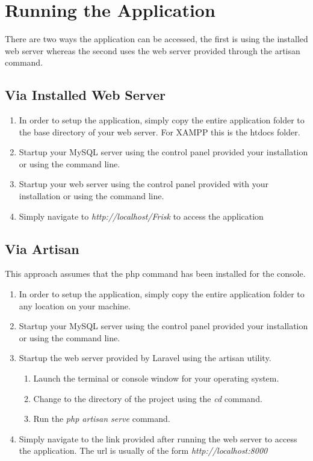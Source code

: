 \documentclass[12pt]{article}
\begin{document}
\section{Running the Application}
There are two ways the application can be accessed, the first is using the installed web server whereas the second uses the web server provided through the artisan command.

\subsection{Via Installed Web Server}
\begin{enumerate}
	\item In order to setup the application, simply copy the entire application folder to the base directory of your web server. For XAMPP this is the htdocs folder.
	\item Startup your MySQL server using the control panel provided your installation or using the command line.
	\item Startup your web server using the control panel provided with your installation or using the command line.
	\item Simply navigate to \emph{http://localhost/Frisk} to access the application
\end{enumerate}

\subsection{Via Artisan}
This approach assumes that the php command has been installed for the console.
\begin{enumerate}
	\item In order to setup the application, simply copy the entire application folder to any location on your machine.
	\item Startup your MySQL server using the control panel provided your installation or using the command line.
	\item Startup the web server provided by Laravel using the artisan utility.
	\begin{enumerate}
		\item Launch the terminal or console window for your operating system.
		\item Change to the directory of the project using the \emph{cd} command.
		\item Run the \emph{php artisan serve} command.
	\end{enumerate}
	\item Simply navigate to the link provided after running the web server to access the application. The url is usually of the form \emph{http://localhost:8000}
\end{enumerate}
\end{document}
